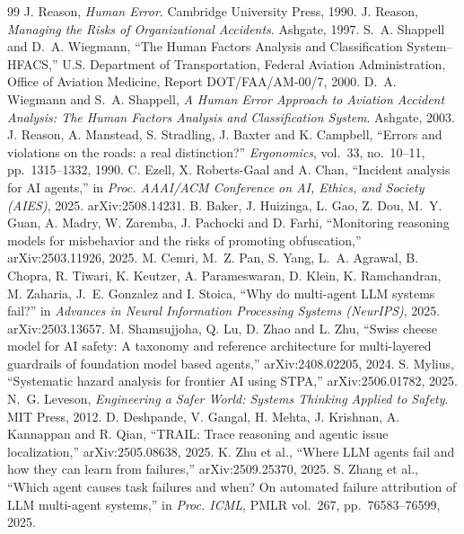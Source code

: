 \documentclass[10pt,a4paper]{article}
\begin{document}
\begin{thebibliography}{99}\small\setlength{\itemsep}{1pt}
 J. Reason, \emph{Human Error}. Cambridge University Press, 1990.
 J. Reason, \emph{Managing the Risks of Organizational Accidents}. Ashgate, 1997.
 S.~A. Shappell and D.~A. Wiegmann, ``The Human Factors Analysis and Classification System--HFACS,'' U.S. Department of Transportation, Federal Aviation Administration, Office of Aviation Medicine, Report DOT/FAA/AM-00/7, 2000.
 D.~A. Wiegmann and S.~A. Shappell, \emph{A Human Error Approach to Aviation Accident Analysis: The Human Factors Analysis and Classification System}. Ashgate, 2003.
 J. Reason, A. Manstead, S. Stradling, J. Baxter and K. Campbell, ``Errors and violations on the roads: a real distinction?'' \emph{Ergonomics}, vol.~33, no.~10--11, pp.~1315--1332, 1990.
 C. Ezell, X. Roberts-Gaal and A. Chan, ``Incident analysis for AI agents,'' in \emph{Proc. AAAI/ACM Conference on AI, Ethics, and Society (AIES)}, 2025. arXiv:2508.14231.
 B. Baker, J. Huizinga, L. Gao, Z. Dou, M.~Y. Guan, A. Madry, W. Zaremba, J. Pachocki and D. Farhi, ``Monitoring reasoning models for misbehavior and the risks of promoting obfuscation,'' arXiv:2503.11926, 2025.
 M. Cemri, M.~Z. Pan, S. Yang, L.~A. Agrawal, B. Chopra, R. Tiwari, K. Keutzer, A. Parameswaran, D. Klein, K. Ramchandran, M. Zaharia, J.~E. Gonzalez and I. Stoica, ``Why do multi-agent LLM systems fail?'' in \emph{Advances in Neural Information Processing Systems (NeurIPS)}, 2025. arXiv:2503.13657.
 M. Shamsujjoha, Q. Lu, D. Zhao and L. Zhu, ``Swiss cheese model for AI safety: A taxonomy and reference architecture for multi-layered guardrails of foundation model based agents,'' arXiv:2408.02205, 2024.
 S. Mylius, ``Systematic hazard analysis for frontier AI using STPA,'' arXiv:2506.01782, 2025.
 N.~G. Leveson, \emph{Engineering a Safer World: Systems Thinking Applied to Safety}. MIT Press, 2012.
 D. Deshpande, V. Gangal, H. Mehta, J. Krishnan, A. Kannappan and R. Qian, ``TRAIL: Trace reasoning and agentic issue localization,'' arXiv:2505.08638, 2025.
 K. Zhu et al., ``Where LLM agents fail and how they can learn from failures,'' arXiv:2509.25370, 2025.
 S. Zhang et al., ``Which agent causes task failures and when? On automated failure attribution of LLM multi-agent systems,'' in \emph{Proc. ICML}, PMLR vol.~267, pp.~76583--76599, 2025.

\end{thebibliography}
\end{document}
